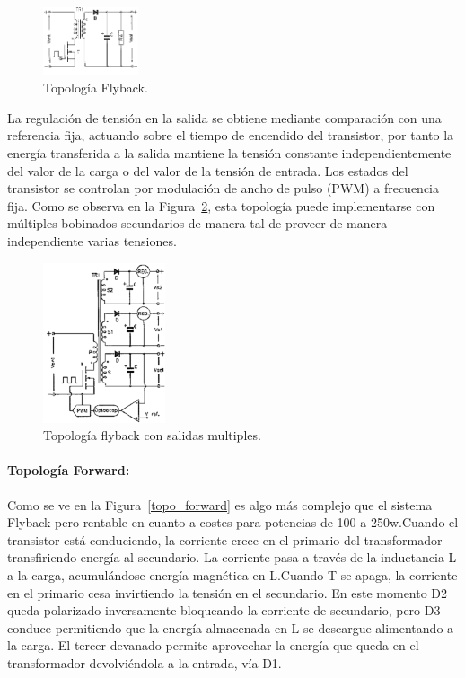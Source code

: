 \begin{figure}[H]
\centering
\includegraphics[width=0.25\textwidth]{img/topo_flyback.png}
\caption{Topología Flyback.}
\label{topo_flyback} 
\end{figure}

La regulación de tensión en la salida se obtiene mediante comparación con una referencia fija, actuando sobre el tiempo de encendido del transistor, por tanto la energía transferida a la salida mantiene la tensión constante independientemente del valor de la carga o del valor de la tensión de entrada. Los estados del transistor se controlan por modulación de ancho de pulso (PWM) a frecuencia fija. Como se observa en la Figura~\ref{topo_flyback_mul}, esta topología puede implementarse con múltiples bobinados secundarios de manera tal de proveer de manera independiente varias tensiones.

\begin{figure}[H]
\centering
\includegraphics[width=0.32\textwidth]{img/topo_flyback_mul.png}
\caption{Topología flyback con salidas multiples.}
\label{topo_flyback_mul} 
\end{figure}

\paragraph*{Topología Forward: }
Como se ve en la Figura~\ref{topo_forward} es algo más complejo que el sistema Flyback pero rentable en cuanto a costes para potencias de 100 a 250w.Cuando el transistor está conduciendo, la corriente crece en el primario del transformador transfiriendo energía al secundario. La corriente pasa a través de la inductancia L a la carga, acumulándose energía magnética en L.Cuando T se apaga, la corriente en el primario cesa invirtiendo la tensión en el secundario. En este momento D2 queda polarizado inversamente bloqueando la corriente de secundario, pero D3 conduce permitiendo que la energía almacenada en L se descargue alimentando a la carga. El tercer devanado permite aprovechar la energía que queda en el transformador devolviéndola a la entrada, vía D1.

